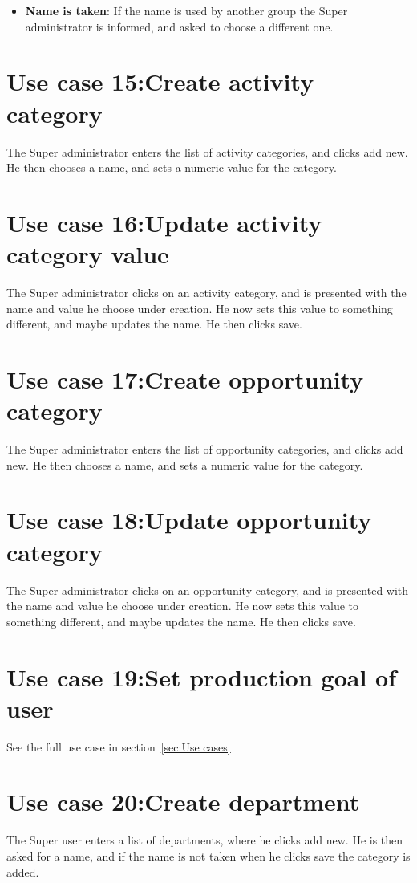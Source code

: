 \begin{itemize}
  \item \textbf{Name is taken}: If the name is used by another group the Super
    administrator is informed, and asked to choose a different one. 
\end{itemize}

\section{Use case 15:Create activity category }
The Super administrator enters the list of activity categories, and clicks add
new. He then chooses a name, and sets a numeric value for the category. 

\section{Use case 16:Update activity category value }
The Super administrator clicks on an activity category, and is presented with
the name and value he choose under creation. He now sets this value to something
different, and maybe updates the name. He then clicks save. 

\section{Use case 17:Create opportunity category }
The Super administrator enters the list of opportunity categories, and clicks
add new. He then chooses a name, and sets a numeric value for the category. 


\section{Use case 18:Update opportunity category }
The Super administrator clicks on an opportunity category, and is presented with
the name and value he choose under creation. He now sets this value to something
different, and maybe updates the name. He then clicks save. 

\section{Use case 19:Set production goal of user }
See the full use case in section~\ref{sec:Use cases}

\section{Use case 20:Create department }
The Super user enters a list of departments, where he clicks add new. He is then
asked for a name, and if the name is not taken when he clicks save the category
is added. 

